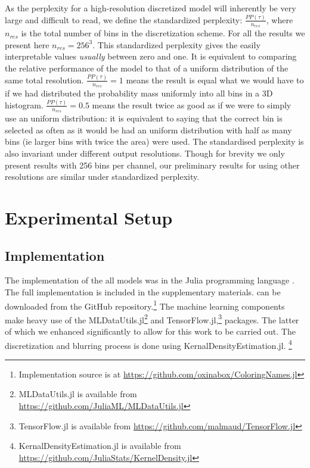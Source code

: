 \documentclass[11pt,a4paper]{article}
\newcommand{\parencite}{\citep}
\begin{document}
As the perplexity for a high-resolution discretized model will inherently be very large and difficult to read,
we define the standardized perplexity: $\frac{PP(\tau)}{n_{res}}$,
where $n_{res}$ is the total number of bins in the discretization scheme.
For all the results we present here $n_{res} = 256^3$.
This standardized perplexity gives the easily interpretable values \emph{usually} between zero and one.
It is equivalent to comparing the relative performance of the model to that of a uniform distribution of the same total resolution.
$\frac{PP(\tau)}{n_{res}}=1$ means the result is equal what we would have to if we had distributed the probability mass uniformly into all bins in a 3D histogram.
$\frac{PP(\tau)}{n_{res}}=0.5$ means the result twice as good as if we were to simply use an uniform distribution: it is equivalent to saying that the correct bin is selected as often as it would be had an uniform distribution with half as many bins (ie larger bins with twice the area) were used.
The standardised perplexity is also invariant under different output resolutions.
Though for brevity we only  present results with 256 bins per channel, our preliminary results for using other resolutions are similar under standardized perplexity.









\section{Experimental Setup}

\subsection{Implementation}
The implementation of the all models was in the Julia programming language \parencite{Julia}.
The full implementation is included in the supplementary materials.
can be downloaded from the GitHub repository.\footnote{Implementation source is at \url{https://github.com/oxinabox/ColoringNames.jl}}
The machine learning components make heavy use of the MLDataUtils.jl\footnote{MLDataUtils.jl is available from \url{https://github.com/JuliaML/MLDataUtils.jl}} and TensorFlow.jl,\footnote{TensorFlow.jl is available from \url{https://github.com/malmaud/TensorFlow.jl}} packages.
The latter of which we enhanced significantly to allow for this work to be carried out.
The discretization and blurring process is done using KernalDensityEstimation.jl.%
\footnote{KernalDensityEstimation.jl  is available from \url{https://github.com/JuliaStats/KernelDensity.jl}}
\end{document}
